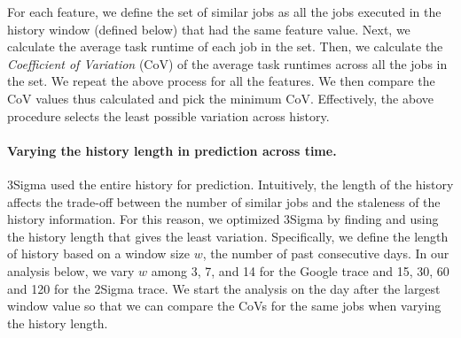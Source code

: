 For each feature, we define the set of similar jobs as
all the jobs executed in the history window
(defined below) that had the same feature value.
Next, we calculate the average task runtime of each job in the set. Then, we
calculate the {\em Coefficient of Variation} (CoV) of the average task runtimes
across all the jobs in the set. We repeat the above process for all the
features.  We then compare the CoV values thus calculated and pick the minimum
CoV.
Effectively, the above procedure selects the least possible variation
across history.

\paragraph{Varying the history length in prediction across time.}
3Sigma used the entire history for prediction.
Intuitively, the length of the history affects the trade-off between
the number of similar jobs and the staleness of the history information.
For this reason, we optimized 3Sigma
by finding and using the history length that gives the least variation.
Specifically, we define the length of history based
on a window size $w$, \ie the number of past consecutive days.
In our analysis below, we vary $w$ among 3, 7, and 14 for the Google trace and 15, 30, 60 and
120 for the 2Sigma trace.
\rm{We start the analysis on the day after the largest window value
  so that we can compare the CoVs for the same jobs when varying the history length.
  }


